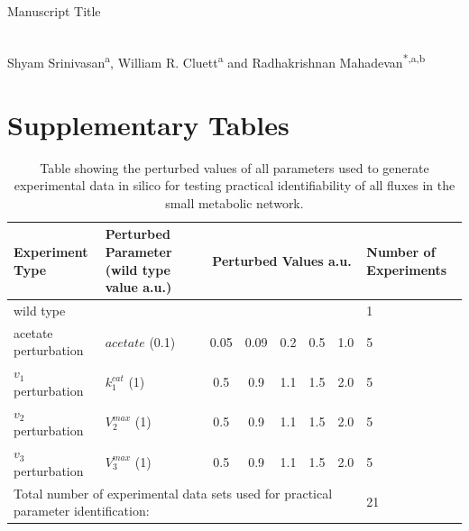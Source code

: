 \documentclass[10pt]{article}
\begin{document}
	\begin{center}
		\begin{Large}
			Manuscript Title 
		\end{Large}\\
		Shyam Srinivasan\textsuperscript{a}, William R. Cluett\textsuperscript{a} and Radhakrishnan Mahadevan\textsuperscript{*,a,b}\\
	\end{center}	
\section{Supplementary Tables}
\begin{table}[!thbp]
	\caption{Table showing the perturbed values of all parameters used to generate experimental data in silico for testing practical identifiability of all fluxes in the small metabolic network.}
	\begin{center}				
		\begin{tabular}{lp{3.5cm}cccccp{2cm}}
			\hline
			Experiment Type & Perturbed Parameter (wild type value a.u.)& \multicolumn{5}{c}{Perturbed Values a.u.} & Number of Experiments\\
			\hline
			wild type &  &\multicolumn{5}{l}{} & 1\\
			acetate perturbation & $acetate$ (0.1) & 0.05 & 0.09 & 0.2 & 0.5 & 1.0 & 5\\
			$v_1$ perturbation & $k_1^{cat}$ (1) & 0.5 & 0.9 & 1.1 & 1.5 & 2.0 & 5\\				
			$v_2$ perturbation & $V_2^{max}$ (1) & 0.5 & 0.9 & 1.1 & 1.5 & 2.0 & 5\\								
			$v_3$ perturbation & $V_3^{max}$ (1) & 0.5 & 0.9 & 1.1 & 1.5 & 2.0 & 5\\
			\hline
			\multicolumn{7}{l}{Total number of experimental data sets used for practical parameter identification:} & 21\\
			\hline
		\end{tabular}
	\end{center}	
	\label{tab:pval}
\end{table}	

\clearpage
\end{document}
